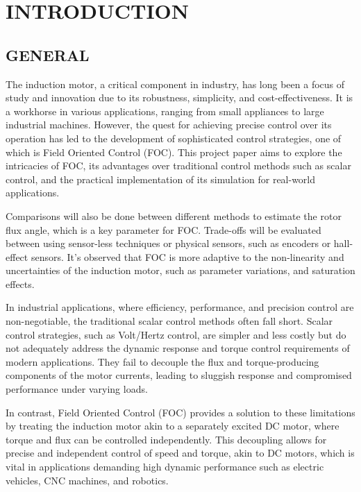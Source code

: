 \clearpage
{}


\section{\centering INTRODUCTION}

\subsection{GENERAL}

\hspace{0.2in} The induction motor, a critical component in industry, has long been a focus of study and innovation due to its robustness, simplicity, and cost-effectiveness. It is a workhorse in various applications, ranging from small appliances to large industrial machines. However, the quest for achieving precise control over its operation has led to the development of sophisticated control strategies, one of which is Field Oriented Control (FOC). This project paper aims to explore the intricacies of FOC, its advantages over traditional control methods such as scalar control, and the practical implementation of its simulation for real-world applications.

Comparisons will also be done between different methods to estimate the rotor flux angle, which is a key parameter for FOC. Trade-offs will be evaluated between using sensor-less techniques or physical sensors, such as encoders or hall-effect sensors. It’s observed that FOC is more adaptive to the non-linearity and uncertainties of the induction motor, such as parameter variations, and saturation effects.


In industrial applications, where efficiency, performance, and precision control are non-negotiable, the traditional scalar control methods often fall short. Scalar control strategies, such as Volt/Hertz control, are simpler and less costly but do not adequately address the dynamic response and torque control requirements of modern applications. They fail to decouple the flux and torque-producing components of the motor currents, leading to sluggish response and compromised performance under varying loads.

In contrast, Field Oriented Control (FOC) provides a solution to these limitations by treating the induction motor akin to a separately excited DC motor, where torque and flux can be controlled independently. This decoupling allows for precise and independent control of speed and torque, akin to DC motors, which is vital in applications demanding high dynamic performance such as electric vehicles, CNC machines, and robotics.

